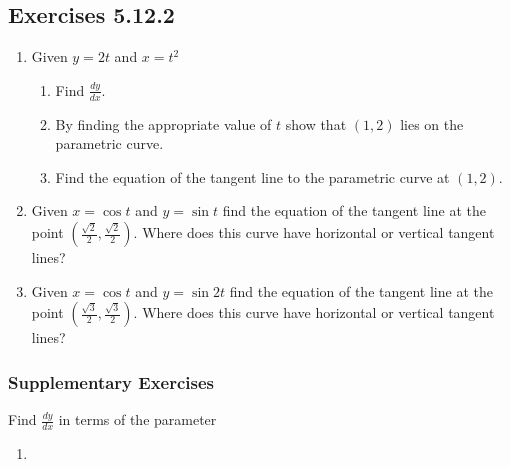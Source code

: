 \subsection{Exercises 5.12.2}
\begin{enumerate}
\item Given $y =2 t$ and $x =t^{2}$ 


\begin{enumerate}
\item Find $\frac{d y}{d x}$. 

\item By finding the appropriate value of $t$ show that $(1 ,2)$ lies on the parametric curve. 

\item Find
the equation of the tangent line to the parametric curve at $(1 ,2)$. \end{enumerate}


\item Given
$x =\cos  t$ and $y =\sin  t$ find the equation of the tangent line at the point $\left (\frac{\sqrt{2}}{2} ,\frac{\sqrt{2}}{2}\right )$. Where does this curve
have horizontal or vertical tangent lines? 

\item Given $x =\cos  t$ and $y =\sin  2 t$ find the equation of the tangent line at the point $\left (\frac{\sqrt{3}}{2} ,\frac{\sqrt{3}}{2}\right )$. Where does this curve
have horizontal or vertical tangent lines? \end{enumerate}


\subsubsection{Supplementary Exercises}
Find $\frac{d y}{d x}$ in terms of the parameter 


\begin{enumerate}
\item   
\columnsep =30pt
 \end{enumerate}


